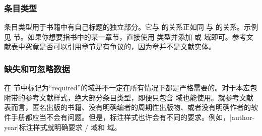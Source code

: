 \subsubsection[\texttt{@inbook} 条目类型]{ 条目类型}
\label{bib:use:inb}


 条目类型用于书籍中有自己标题的独立部分。它与  的关系正如同  与  的关系。示例见  节。如果你想要指书中的某一章节，直接使用  类型并添加  或  域即可。参考文献表中究竟是否可以引用章节是有争议的，因为章并不是文献实体。

\subsubsection{缺失和可忽略数据}
\label{bib:use:key}


在  节中标记为“required”的域并不一定在所有情况下都是严格需要的。对于本宏包附带的参考文献样式，绝大部分条目类型，即便只包含  域也能使用。就参考文献表而言，匿名出版的书籍、没有明确编者的周期性出版物、或者没有明确作者的软件手册都应当不会有问题。但是，标注样式也许会有不同的要求。例如，|author-year|标注样式就明确要求 \slash {} 域和  域。

